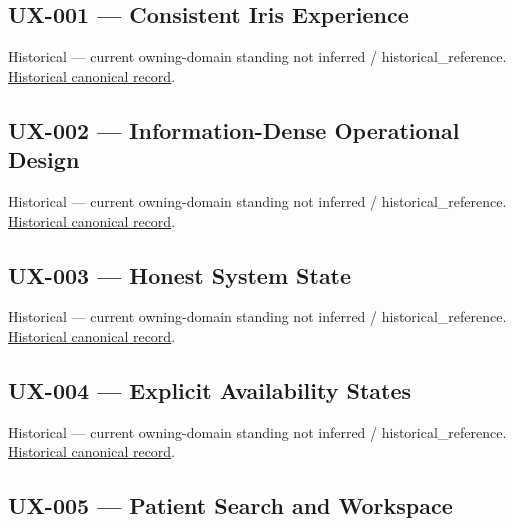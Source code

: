 \subsection{UX-001 — Consistent Iris Experience}

\par\label{element:6bea2694012442a39034a6cbfcc79e90}
Historical — current owning-domain standing not inferred / historical\_reference. \href{../../../../continuum/motivation/requirement/6bea2694012442a39034a6cbfcc79e90.md}{Historical canonical record}.\par

\subsection{UX-002 — Information-Dense Operational Design}

\par\label{element:73354d29efa74895afebec8437c875e8}
Historical — current owning-domain standing not inferred / historical\_reference. \href{../../../../continuum/motivation/requirement/73354d29efa74895afebec8437c875e8.md}{Historical canonical record}.\par

\subsection{UX-003 — Honest System State}

\par\label{element:752452c7367d4d4dbc1cb9ffe0bfd78f}
Historical — current owning-domain standing not inferred / historical\_reference. \href{../../../../continuum/motivation/requirement/752452c7367d4d4dbc1cb9ffe0bfd78f.md}{Historical canonical record}.\par

\subsection{UX-004 — Explicit Availability States}

\par\label{element:0e4b5219260e419d987195c9832a0bbe}
Historical — current owning-domain standing not inferred / historical\_reference. \href{../../../../continuum/motivation/requirement/0e4b5219260e419d987195c9832a0bbe.md}{Historical canonical record}.\par

\subsection{UX-005 — Patient Search and Workspace}

